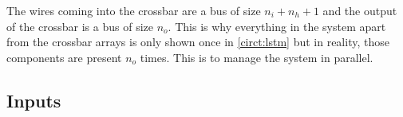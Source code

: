 The wires coming into the crossbar are a bus of size $n_i+n_h+1$ and the output of the crossbar is a bus of size $n_o$. This is why everything in the system apart from the crossbar arrays is only shown once in \cref{circt:lstm} but in reality, those components are present $n_o$ times. This is to manage the system in parallel.

\subsection{Inputs}%
